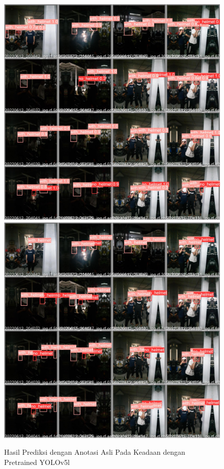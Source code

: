 \begin{figure}[ht]
  \centering
  \includegraphics[scale=0.1]{gambar/train_v2_val/low_ligjt/yololarge/val_batch0_pred.jpg}
  \includegraphics[scale=0.1]{gambar/train_v2_val/low_ligjt/yololarge/val_batch0_labels.jpg}
  \caption{Hasil Prediksi dengan Anotasi Asli Pada Keadaan dengan Pretrained YOLOv5l}
\end{figure}

